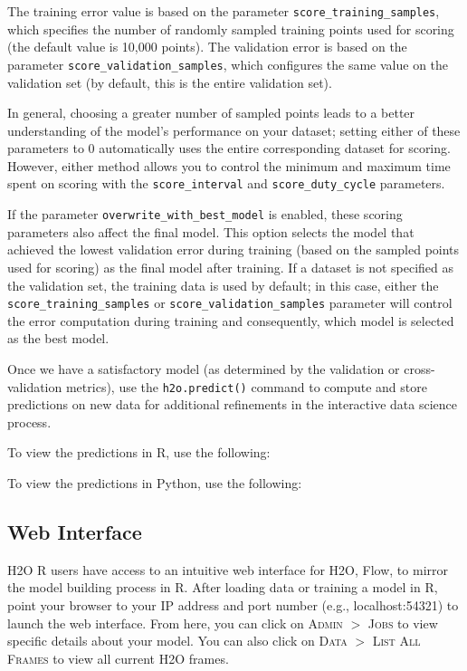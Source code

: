 {{\noindent
The training error value is based on the parameter \texttt{score\_training\_samples}, which specifies the number of randomly sampled training points used for scoring (the default value is 10,000 points). The validation error is based on the parameter \texttt{score\_validation\_samples}, which configures the same value on the validation set (by default, this is the entire validation set).

In general, choosing a greater number of sampled points leads to a better understanding of the model's performance on your dataset; setting either of these parameters to 0 automatically uses the entire corresponding dataset for scoring. However, either method allows you to control the minimum and maximum time spent on scoring with the \texttt{score\_interval} and \texttt{score\_duty\_cycle} parameters.

If the parameter \texttt{overwrite\_with\_best\_model} is enabled, these scoring parameters also affect the final model. This option selects the model that achieved the lowest validation error during training (based on the sampled points used for scoring) as the final model after training. If a dataset is not specified as the validation set, the training data is used by default; in this case, either the \texttt{score\_training\_samples} or \texttt{score\_validation\_samples} parameter will control the error computation during training and consequently, which model is selected as the best model.

Once we have a satisfactory model (as determined by the validation or cross-validation metrics), use the \texttt{h2o.predict()} command to compute and store predictions on new data for additional refinements in the interactive data science process.\nowidow[4]

To view the predictions in R, use the following: 

\waterExampleInR


\newpage
To view the predictions in Python, use the following: 

\waterExampleInPython


\subsection{Web Interface} 

H2O R users have access to an intuitive web interface for H2O, Flow, to mirror the model building process in R. After loading data or training a model in R, point your browser to your IP address and port number (e.g., localhost:54321) to launch the web interface. From here, you can click on \textsc{Admin} $>$ \textsc{Jobs} to view specific details about your model. You can also click on \textsc{Data} $>$ \textsc{List All Frames} to view all current H2O frames. 

}}
